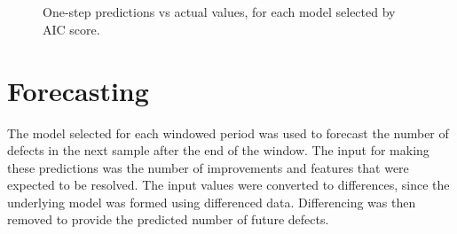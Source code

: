 \documentclass[letterpaper]{report}
\begin{document}
\begin{figure}[htbp]
\centering
{}\\
\\
%
\caption[One-step predictions]{One-step predictions vs actual values, for each model selected by AIC score.}
\label{fig:one_step_predictions}
\end{figure}


\section*{Forecasting}

The model selected for each windowed period was used to forecast the number of defects in the next sample after the end of the window. The input for making these predictions was the number of improvements and features that were expected to be resolved. The input values were converted to differences, since the underlying model was formed using differenced data. Differencing was then removed to provide the predicted number of future defects.
\end{document}

